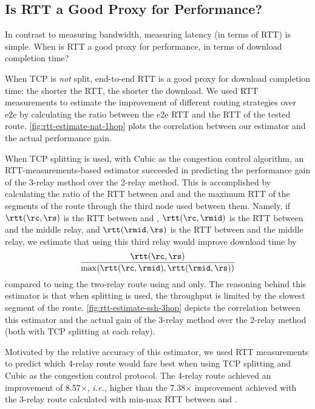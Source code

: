 \documentclass[newfonts=false,format=sigconf,10pt,letterpaper]{acmart}
\providecommand{\ie}{\emph{i.e.,} }
\begin{document}
\subsection{Is RTT a Good Proxy for Performance?}

In contrast to measuring bandwidth, measuring latency (in terms of RTT) is simple. When is RTT a good proxy for performance, in terms of download completion time?

 When TCP is \emph{not} split, end-to-end RTT is a good proxy for download completion time: the shorter the RTT, the shorter the download. We used RTT measurements to estimate the improvement of different routing strategies over e2e by calculating the ratio between the e2e RTT and the RTT of the tested route. \autoref{fig:rtt-estimate-nat-1hop} plots the correlation between our estimator and the actual performance gain. %

 When TCP splitting is used, with Cubic as the congestion control algorithm, an RTT-measurements-based estimator succeeded in predicting the performance gain of the 3-relay method over the 2-relay method. This is accomplished by calculating the ratio of the RTT between \rc and \rs and the maximum RTT of the segments of the route through the third node used between them. Namely, if $\rtt(\rc,\rs)$ is the RTT between \rc and \rs, $\rtt(\rc,\rmid)$ is the RTT between \rc and the middle relay, and $\rtt(\rmid,\rs)$ is the RTT between \rs and the middle relay, we estimate that using this third relay would improve download time by 
\[
\frac{\rtt(\rc,\rs)}{\max(\rtt(\rc,\rmid),\rtt(\rmid,\rs))}
\]
compared to using the two-relay route using \rc and \rs only.
The reasoning behind this estimator is that when splitting is used, the throughput is limited by the slowest segment of the route. \autoref{fig:rtt-estimate-ssh-3hop} depicts the correlation between this estimator and the actual gain of the 3-relay method over the 2-relay method (both with TCP splitting at each relay).

Motivated by the relative accuracy of this estimator, we used RTT measurements to predict which 4-relay route would fare best when using TCP splitting and Cubic as the congestion control protocol. The 4-relay route achieved an improvement of 8.57$\times$, \ie higher than the 7.38$\times$ improvement achieved with the 3-relay route calculated with min-max RTT between \rc and \rs. 
 
\end{document}
